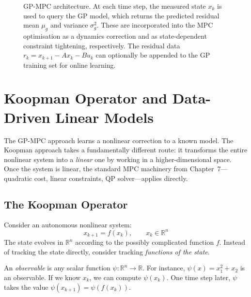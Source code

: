 \begin{figure}[ht]
	\caption{GP-MPC architecture. At each time step, the measured state $x_k$ is used to query the GP model, which returns the predicted residual mean $\mu_g$ and variance $\sigma_g^2$. These are incorporated into the MPC optimisation as a dynamics correction and as state-dependent constraint tightening, respectively. The residual data $r_k = x_{k+1} - Ax_k - Bu_k$ can optionally be appended to the GP training set for online learning.}
	\label{fig:gpmpc_architecture}
\end{figure}


\section{Koopman Operator and Data-Driven Linear Models}
\label{sec:koopman}

The GP-MPC approach learns a nonlinear correction to a known model. The Koopman approach takes a fundamentally different route: it transforms the entire nonlinear system into a \emph{linear} one by working in a higher-dimensional space. Once the system is linear, the standard MPC machinery from Chapter~7---quadratic cost, linear constraints, QP solver---applies directly.

\subsection{The Koopman Operator}
\label{sec:koopman_theory}

Consider an autonomous nonlinear system:
\[
x_{k+1} = f(x_k), \qquad x_k \in \mathbb{R}^n
\]
The state evolves in $\mathbb{R}^n$ according to the possibly complicated function $f$. Instead of tracking the state directly, consider tracking \emph{functions of the state}.

An \emph{observable} is any scalar function $\psi \colon \mathbb{R}^n \to \mathbb{R}$. For instance, $\psi(x) = x_1^2 + x_2$ is an observable. If we know $x_k$, we can compute $\psi(x_k)$. One time step later, $\psi$ takes the value $\psi(x_{k+1}) = \psi(f(x_k))$.

